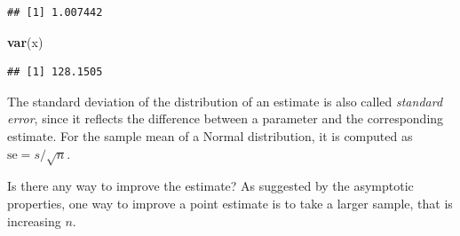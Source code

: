 \documentclass[
]{article}
\newenvironment{Shaded}{\begin{snugshade}}{\end{snugshade}}
\newcommand{\FunctionTok}[1]{\textcolor[rgb]{0.13,0.29,0.53}{\textbf{#1}}}
\newcommand{\NormalTok}[1]{#1}
\newcommand{\SpecialCharTok}[1]{\textcolor[rgb]{0.81,0.36,0.00}{\textbf{#1}}}
\begin{document}
\begin{Shaded}
\end{Shaded}

\begin{verbatim}
## [1] 1.007442
\end{verbatim}

\begin{Shaded}
\begin{Highlighting}[]
\FunctionTok{var}\NormalTok{(x)}
\end{Highlighting}
\end{Shaded}

\begin{verbatim}
## [1] 128.1505
\end{verbatim}

The standard deviation of the distribution of an estimate is also called
\emph{standard error}, since it reflects the difference between a
parameter and the corresponding estimate. For the sample mean of a
Normal distribution, it is computed as \(\mbox{se} = s/\sqrt{n}\).

Is there any way to improve the estimate? As suggested by the asymptotic
properties, one way to improve a point estimate is to take a larger
sample, that is increasing \(n\).
\end{document}
